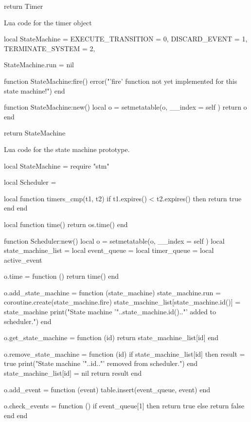 \begin{appendices}
\begin{listing}[htp]
\begin{luacode}
return Timer
\end{luacode}
	\caption{Lua code for the timer object }
	\label{code:timer}
\end{listing}

\begin{listing}[htp]
\begin{luacode}
local StateMachine = {
	EXECUTE_TRANSITION = 0,
	DISCARD_EVENT = 1,
	TERMINATE_SYSTEM = 2,
}

StateMachine.run = nil

function StateMachine:fire()
	error("'fire' function not yet implemented for this state machine!")
end

function StateMachine:new()
	local o = {}
	setmetatable(o, { __index = self })
	return o
end

return StateMachine
\end{luacode}
	\caption{Lua code for the state machine prototype.}
	\label{code:stm}
\end{listing}

\begin{listing}[htp]
\begin{luacode}
local StateMachine = require "stm"

local Scheduler = {}

local function timers_cmp(t1, t2)
	if t1.expires() < t2.expires() then return true end
end

local function time()
	return os.time()
end

function Scheduler:new()
	local o = {}
	setmetatable(o, { __index = self })
	local state_machine_list = {}
	local event_queue = {}
	local timer_queue = {}
	local active_event

	o.time = function ()
		return time()
	end

	o.add_state_machine = function (state_machine)
		state_machine.run = coroutine.create(state_machine.fire)
		state_machine_list[state_machine.id()] = state_machine
		print("State machine '"..state_machine.id().."' added to scheduler.")
	end

	o.get_state_machine = function (id)
		return state_machine_list[id]
	end

	o.remove_state_machine = function (id)
		if state_machine_list[id] then
			result = true
			print("State machine '"..id.."' removed from scheduler.")
		end
		state_machine_list[id] = nil
		return result
	end

	o.add_event = function (event)
		table.insert(event_queue, event)
	end

	o.check_events = function ()
		if event_queue[1] then return true
		else return false end
	end


\end{luacode}
\end{listing}
\end{appendices}
